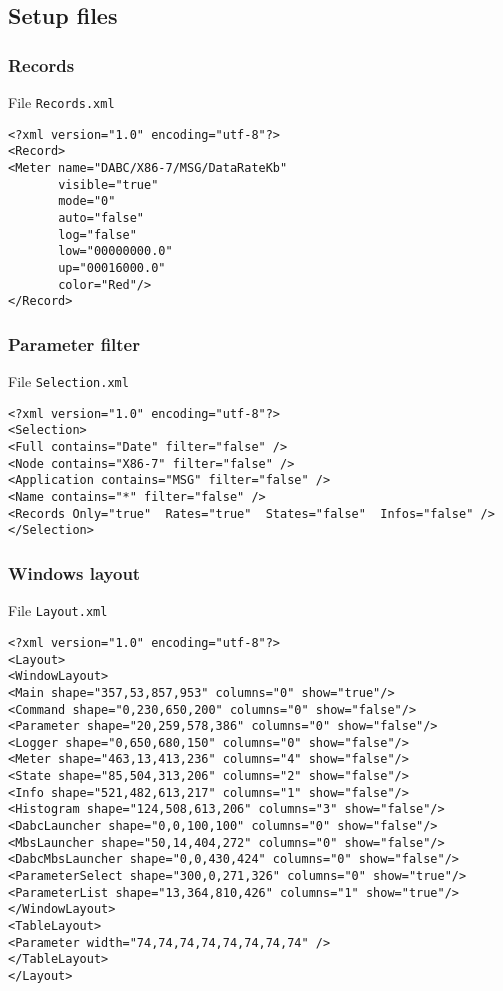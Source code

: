 \subsection{Setup files}
\subsubsection{Records}
File {\tt Records.xml}
\begin{verbatim}
<?xml version="1.0" encoding="utf-8"?>
<Record>
<Meter name="DABC/X86-7/MSG/DataRateKb" 
       visible="true" 
       mode="0" 
       auto="false" 
       log="false" 
       low="00000000.0" 
       up="00016000.0" 
       color="Red"/>
</Record>
\end{verbatim}
\subsubsection{Parameter filter}
File {\tt Selection.xml}
\begin{verbatim}
<?xml version="1.0" encoding="utf-8"?>
<Selection>
<Full contains="Date" filter="false" />
<Node contains="X86-7" filter="false" />
<Application contains="MSG" filter="false" />
<Name contains="*" filter="false" />
<Records Only="true"  Rates="true"  States="false"  Infos="false" />
</Selection>
\end{verbatim}
\subsubsection{Windows layout}
File {\tt Layout.xml}
\begin{verbatim}
<?xml version="1.0" encoding="utf-8"?>
<Layout>
<WindowLayout>
<Main shape="357,53,857,953" columns="0" show="true"/>
<Command shape="0,230,650,200" columns="0" show="false"/>
<Parameter shape="20,259,578,386" columns="0" show="false"/>
<Logger shape="0,650,680,150" columns="0" show="false"/>
<Meter shape="463,13,413,236" columns="4" show="false"/>
<State shape="85,504,313,206" columns="2" show="false"/>
<Info shape="521,482,613,217" columns="1" show="false"/>
<Histogram shape="124,508,613,206" columns="3" show="false"/>
<DabcLauncher shape="0,0,100,100" columns="0" show="false"/>
<MbsLauncher shape="50,14,404,272" columns="0" show="false"/>
<DabcMbsLauncher shape="0,0,430,424" columns="0" show="false"/>
<ParameterSelect shape="300,0,271,326" columns="0" show="true"/>
<ParameterList shape="13,364,810,426" columns="1" show="true"/>
</WindowLayout>
<TableLayout>
<Parameter width="74,74,74,74,74,74,74,74" />
</TableLayout>
</Layout>
\end{verbatim}
